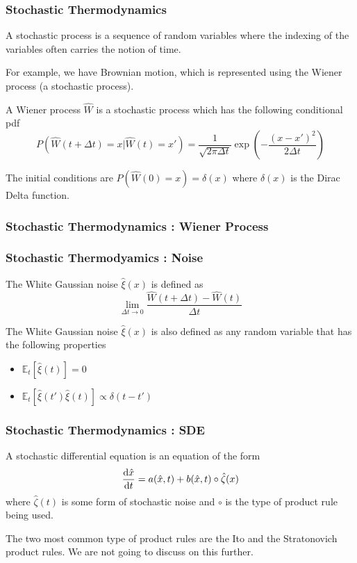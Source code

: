 \documentclass{beamer}
\begin{document}
\begin{frame}
  \frametitle{Stochastic Thermodynamics}
  \begin{definition}

    A stochastic process is a sequence of random variables where the indexing of the variables
    often carries the notion of time.

  \end{definition}
  For example, we have Brownian motion, which is represented using the Wiener process
  (a stochastic process).
  \begin{definition}
    A Wiener process $\hat{W}$ is a stochastic process which has the following conditional pdf
    \begin{displaymath}
      P(\hat{W}(t+\Delta t)=x | \hat{W}(t)=x') = \frac{1}{\sqrt{2 \pi \Delta t}}\exp(-\frac{(x-x')^2}{2 \Delta t})
    \end{displaymath}

  \end{definition}
  The initial conditions are $P(\hat{W}(0) = x) = \delta(x)$ where $\delta(x)$ is the Dirac Delta
  function.
\end{frame}
\begin{frame}
  \frametitle{Stochastic Thermodynamics : Wiener Process}
\end{frame}
\begin{frame}
  \frametitle{Stochastic Thermodyamics : Noise}
  \begin{definition}
    The White Gaussian noise $\hat{\xi}(x)$ is defined as 
    \begin{displaymath}
      \lim_{\Delta t \rightarrow 0} \frac{\hat{W}(t+\Delta t)-\hat{W}(t)}{\Delta t}
    \end{displaymath}
  \end{definition}
  \begin{definition}
    The White Gaussian noise $\hat{\xi}(x)$ is also defined as any random variable that has the 
    following properties
      \begin{itemize}
        \item $\mathbb{E}_{t}[\hat{\xi}(t)] = 0$
        \item $\mathbb{E}_{t}[\hat{\xi}(t')\hat{\xi}(t)] \propto \delta (t-t')$
    \end{itemize}
  \end{definition}
  
\end{frame}
\begin{frame}
  \frametitle{Stochastic Thermodynamics : SDE}
  \begin{definition}
    A stochastic differential equation is an equation of the form 
    \begin{displaymath}
      \dv{\hat{x}}{t} = a(\hat{x},t) + b(\hat{x},t)\circ\hat{\zeta}(x)
    \end{displaymath}
    where $\hat{\zeta}(t)$ is some form of stochastic noise and $\circ$ is the type of product rule 
    being used.

  \end{definition}
  The two most common type of product rules are the Ito and the Stratonovich product rules. We 
  are not going to discuss on this further.
\end{frame}
\end{document}
